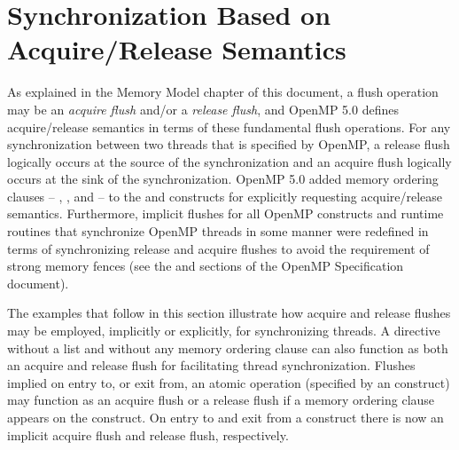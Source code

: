 \section{Synchronization Based on Acquire/Release Semantics}
\label{sec:acquire_and_release_semantics}


As explained in the Memory Model chapter of this document, a flush operation
may be an \emph{acquire flush} and/or a \emph{release flush}, and OpenMP 5.0
defines acquire/release semantics in terms of these fundamental flush
operations.  For any synchronization between two threads that is specified by
OpenMP, a release flush logically occurs at the source of the synchronization
and an acquire flush logically occurs at the sink of the synchronization.
OpenMP 5.0 added memory ordering clauses -- , , and
 -- to the  and  constructs for
explicitly requesting acquire/release semantics.  Furthermore, implicit flushes
for all OpenMP constructs and runtime routines that synchronize OpenMP threads
in some manner were redefined in terms of synchronizing release and acquire
flushes to avoid the requirement of strong memory fences (see the  and  sections of the
OpenMP Specification document).

The examples that follow in this section illustrate how acquire and release
flushes may be employed, implicitly or explicitly, for synchronizing threads. A
 directive without a list and without any memory ordering clause
can also function as both an acquire and release flush for facilitating thread
synchronization.  Flushes implied on entry to, or exit from, an atomic
operation (specified by an  construct) may function as an acquire
flush or a release flush if a memory ordering clause appears on the construct.
On entry to and exit from a  construct there is now an implicit
acquire flush and release flush, respectively.

